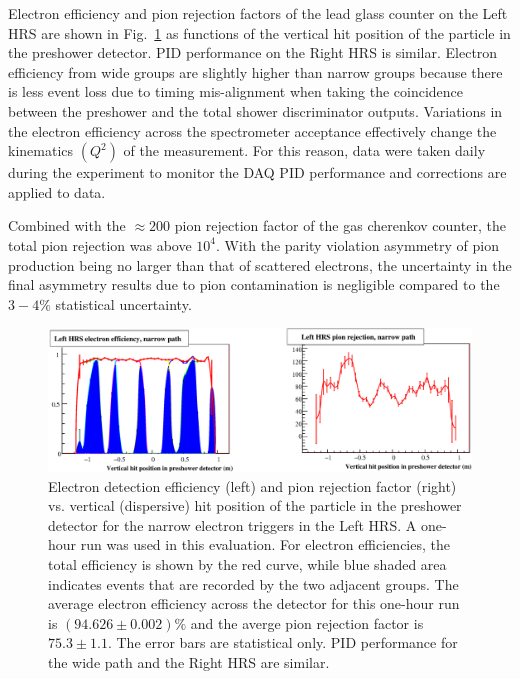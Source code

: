 Electron efficiency
and pion rejection factors of the lead glass counter on the Left HRS are 
shown in Fig.~\ref{fig:pidLeft} as functions of the vertical hit position 
of the particle in the preshower detector. PID performance on the Right HRS
is similar.
%
Electron efficiency from wide groups are slightly higher than narrow groups
because there is less event loss due to timing mis-alignment when taking the
coincidence between the preshower and the total shower discriminator outputs.
%
Variations in the electron efficiency across the spectrometer acceptance 
effectively change the kinematics $(Q^2)$ of the measurement. For this reason, 
data were taken daily during the experiment to monitor the DAQ PID performance
and corrections are applied to data. 

Combined with the $\approx 200$ pion rejection factor of the gas cherenkov
counter, the total pion rejection was above $10^{4}$. With the parity violation
asymmetry of pion production being no larger than that of scattered electrons, 
the uncertainty in the final asymmetry results due to pion contamination is
negligible compared to the $3-4\%$ statistical uncertainty.

\begin{figure}[!ht]
\hspace*{-0.6cm}
\includegraphics[width=\textwidth,angle=0]{RM/PIDLeft_edit_horizontal.eps}
\caption{Electron detection efficiency (left) and pion rejection factor (right) 
vs. vertical (dispersive) hit position of the particle in the preshower detector 
for the narrow electron triggers in the Left HRS. A one-hour run was used in this 
evaluation.
For electron efficiencies, the total efficiency is shown by the red curve, while blue 
shaded area indicates events that are recorded by the two adjacent groups. 
The average electron efficiency across the detector for this one-hour run
is $(94.626\pm 0.002)\%$ and the averge
pion rejection factor is $75.3\pm 1.1$. The error bars are statistical only.
PID performance for the wide path and the Right HRS are similar.
}
\label{fig:pidLeft}
\end{figure}


